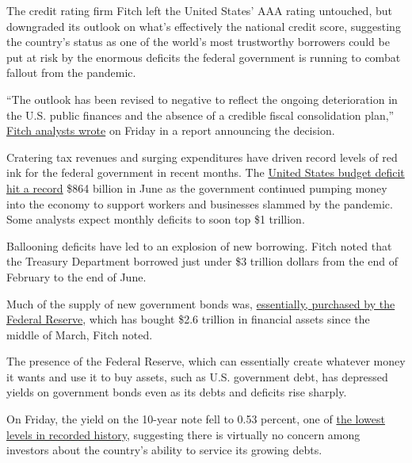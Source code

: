 The credit rating firm Fitch left the United States' AAA rating
untouched, but downgraded its outlook on what's effectively the national
credit score, suggesting the country's status as one of the world's most
trustworthy borrowers could be put at risk by the enormous deficits the
federal government is running to combat fallout from the pandemic.

``The outlook has been revised to negative to reflect the ongoing
deterioration in the U.S. public finances and the absence of a credible
fiscal consolidation plan,''
\href{https://www.fitchratings.com/research/sovereigns/fitch-revises-united-states-outlook-to-negative-affirms-at-aaa-31-07-2020}{Fitch
analysts wrote} on Friday in a report announcing the decision.

Cratering tax revenues and surging expenditures have driven record
levels of red ink for the federal government in recent months. The
\href{https://www.nytimes3xbfgragh.onion/live/2020/07/13/business/stock-market-today-coronavirus\#the-us-budget-deficit-hits-another-monthly-record}{United
States budget deficit hit a record} \$864 billion in June as the
government continued pumping money into the economy to support workers
and businesses slammed by the pandemic. Some analysts expect monthly
deficits to soon top \$1 trillion.

Ballooning deficits have led to an explosion of new borrowing. Fitch
noted that the Treasury Department borrowed just under \$3 trillion
dollars from the end of February to the end of June.

Much of the supply of new government bonds was,
\href{https://www.nytimes3xbfgragh.onion/2020/04/15/business/coronavirus-stimulus-money.html}{essentially,
purchased by the Federal Reserve}, which has bought \$2.6 trillion in
financial assets since the middle of March, Fitch noted.

The presence of the Federal Reserve, which can essentially create
whatever money it wants and use it to buy assets, such as U.S.
government debt, has depressed yields on government bonds even as its
debts and deficits rise sharply.

On Friday, the yield on the 10-year note fell to 0.53 percent, one of
\href{https://www.marketwatch.com/story/10-year-treasury-yield-plunged-to-its-lowest-in-234-years-says-deutsche-bank-11596214464\#:~:text=The\%2010\%2Dyear\%20Treasury\%20note,scurrying\%20into\%20safe\%20haven\%20assets.}{the
lowest levels in recorded history}, suggesting there is virtually no
concern among investors about the country's ability to service its
growing debts.

